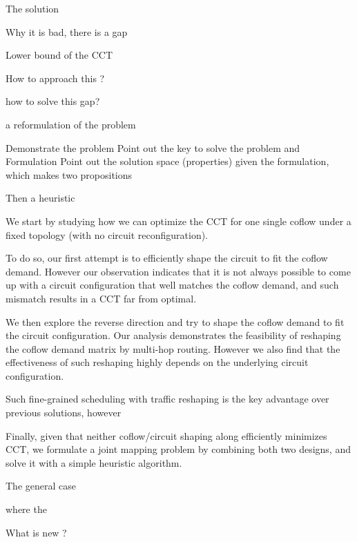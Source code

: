 {The solution

Why it is bad, there is a gap

Lower bound of the CCT

How to approach this ?

how to solve this gap?

a reformulation of the problem

Demonstrate the problem
Point out the key to solve the problem and
Formulation
Point out the solution space (properties) given the formulation, which makes two propositions

Then a heuristic

We start by studying how we can optimize the CCT for one single coflow under a fixed topology (\ie with no circuit reconfiguration). %

To do so, our first attempt is to efficiently shape the circuit to fit the coflow demand.
However our observation indicates that it is not always possible to come up with a circuit configuration that well matches the coflow demand, and such mismatch results in a CCT far from optimal.

We then explore the reverse direction %
and try to shape the coflow demand to fit the circuit configuration.
Our analysis demonstrates the feasibility of reshaping the coflow demand matrix by multi-hop routing.
However we also find that the effectiveness of such reshaping highly depends on the underlying circuit configuration.

Such fine-grained scheduling with traffic reshaping is the key advantage over previous solutions, however


Finally, given that neither coflow/circuit shaping along efficiently minimizes CCT, we formulate a joint mapping problem by combining both two designs, and solve it with a simple heuristic algorithm.



The general case

where the

What is new ?

}
